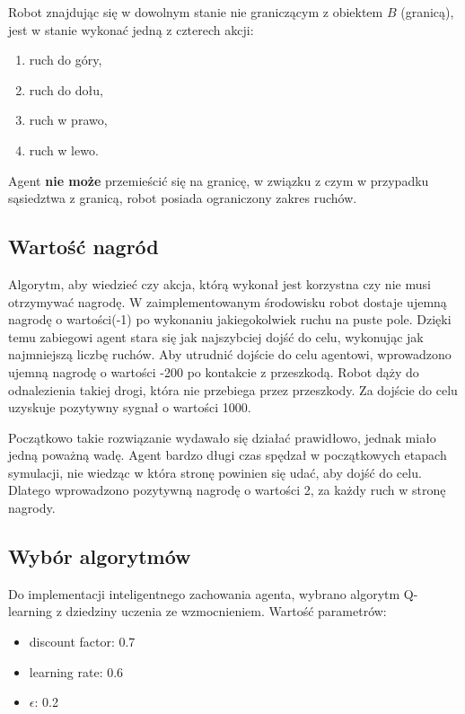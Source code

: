 Robot znajdując się w dowolnym stanie nie graniczącym z obiektem $B$ (granicą), jest w stanie wykonać jedną z czterech 
akcji:

\begin{enumerate}
 \item ruch do góry,
 \item ruch do dołu,
 \item ruch w prawo,
 \item ruch w lewo.
\end{enumerate}

Agent \textbf{nie może} przemieścić się na granicę, w związku z czym w przypadku sąsiedztwa z granicą, robot posiada 
ograniczony zakres ruchów. 

\subsection{Wartość nagród}

Algorytm, aby wiedzieć czy akcja, którą wykonał jest korzystna czy nie musi otrzymywać nagrodę. W zaimplementowanym 
środowisku robot dostaje ujemną nagrodę o wartości(-1) po wykonaniu jakiegokolwiek ruchu na puste pole. Dzięki temu 
zabiegowi agent stara się jak najszybciej dojść do celu, wykonując jak najmniejszą liczbę ruchów. Aby utrudnić 
dojście do celu agentowi, wprowadzono ujemną nagrodę o wartości -200 po kontakcie z przeszkodą. Robot dąży do 
odnalezienia takiej drogi, która nie przebiega przez przeszkody. Za dojście do celu uzyskuje pozytywny sygnał o wartości 
1000.

Początkowo takie rozwiązanie wydawało się działać prawidłowo, jednak miało jedną poważną wadę. Agent bardzo długi czas 
spędzał w początkowych etapach symulacji, nie wiedząc w która stronę powinien się udać, aby dojść do celu. Dlatego 
wprowadzono pozytywną nagrodę o wartości 2, za każdy ruch w stronę nagrody.

\subsection{Wybór algorytmów}
\label{subsec:wyboralgorytmow}

Do implementacji inteligentnego zachowania agenta, wybrano algorytm Q-learning z dziedziny uczenia ze wzmocnieniem.
Wartość parametrów:
\begin{itemize}
 \item discount factor: 0.7
 \item learning rate: 0.6
 \item $\epsilon$: 0.2
\end{itemize}

